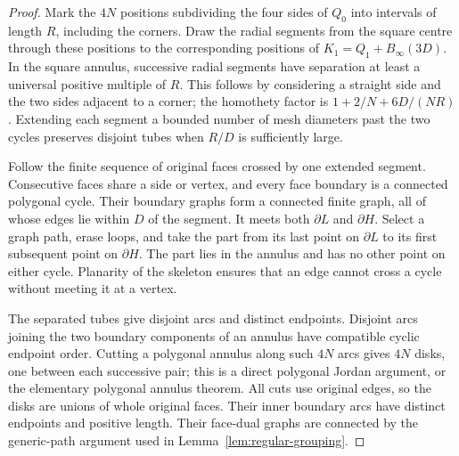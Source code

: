 \begin{proof}
Mark the $4N$ positions subdividing the four sides of $Q_0$ into intervals
of length $R$, including the corners.  Draw the radial segments from the
square centre through these positions to the corresponding positions of
$K_1=Q_1+B_\infty(3D)$.  In the square annulus, successive radial segments
have separation at least a universal positive multiple of $R$.  This
follows by considering a straight side and the two sides adjacent to a
corner; the homothety factor is $1+2/N+6D/(NR)$.  Extending each segment
a bounded number of mesh diameters past the two cycles preserves disjoint
tubes when $R/D$ is sufficiently large.

Follow the finite sequence of original faces crossed by one extended
segment.  Consecutive faces share a side or vertex, and every face boundary
is a connected polygonal cycle.  Their boundary graphs form a connected
finite graph, all of whose edges lie within $D$ of the segment.  It meets
both $\partial L$ and $\partial H$.  Select a graph path, erase loops,
and take the part from its last point on $\partial L$ to its first
subsequent point on $\partial H$.  The part lies in the annulus and has
no other point on either cycle.  Planarity of the skeleton ensures that
an edge cannot cross a cycle without meeting it at a vertex.

The separated tubes give disjoint arcs and distinct endpoints.  Disjoint
arcs joining the two boundary components of an annulus have compatible
cyclic endpoint order.  Cutting a polygonal annulus along such $4N$ arcs
gives $4N$ disks, one between each successive pair; this is a direct
polygonal Jordan argument, or the elementary polygonal annulus theorem.
All cuts use original edges, so the disks are unions of whole original
faces.  Their inner boundary arcs have distinct endpoints and positive
length.  Their face-dual graphs are connected by the generic-path argument
used in Lemma~\ref{lem:regular-grouping}.
\end{proof}

